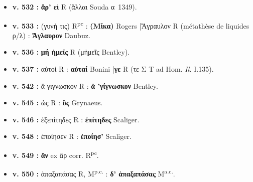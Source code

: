 \documentclass[10pt, a4paper, twoside]{book}
\renewcommand{\_}{\origunderscore\penalty0\relax}
\providecommand{\italique}[1]{\emph{#1}}
\providecommand{\lecon}[1]{\textbf{#1}}
\providecommand{\expo}[1]{\textsuperscript{#1}}
\providecommand{\Rpc}{R\expo{pc}}
\providecommand{\Mon}{M}
\providecommand{\espApp}{\hspace{0.5em}|\hspace{0.5em}}
\begin{document}
\begin{itemize}
\begin{itemize}
    \item \textbf{v. 532 :} \lecon{ἄρ' εἰ} R (ἄλλαι Souda α~1349).
    \item \textbf{v. 533 :} (γυνὴ τις) \Rpc{} : \lecon{(Μίκα)} Rogers \espApp Ἄγραυλον R (métathèse de liquides ρ/λ) : \lecon{Ἄγλαυρον} Daubuz.
    \item \textbf{v. 536 :} \lecon{μή ἡμεῖς} R (μἠμεῖς Bentley).
    \item \textbf{v. 537 :} αὐτοί R : \lecon{αὐταί} Bonini \espApp \lecon{γε} R (τε Σ T ad Hom. \italique{Il.} I.135).
    \item \textbf{v. 542 :} ἅ γιγνωσκον R : \lecon{ἅ 'γίγνωσκον} Bentley.
    \item \textbf{v. 545 :} ὡς R : \lecon{ὃς} Grynaeus.
    \item \textbf{v. 546 :} ἐξεπίτηδες R : \lecon{ἐπίτηδες} Scaliger.
    \item \textbf{v. 548 :} ἐποίησεν R : \lecon{ἐποίησ'} Scaliger.
    \item \textbf{v. 549 :} \lecon{ἂν} ex ἂρ corr. \Rpc{}.
    \item \textbf{v. 550 :} ἁπαξαπάσας R, \Mon\expo{p.c.} : \lecon{δ' ἁπαξαπάσας} \Mon\expo{a.c.}.
  \end{itemize}
\end{itemize}
\end{document}

